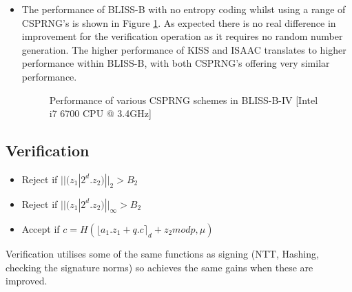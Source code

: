 \begin{itemize}
\item The performance of BLISS-B with no entropy coding whilst using a range of CSPRNG's is shown in Figure \ref{fig:bliss_b_csprng_comparison}. As expected there is no real difference in improvement for the verification operation as it requires no random number generation. The higher performance of KISS and ISAAC translates to higher performance within BLISS-B, with both CSPRNG's offering very similar performance.

\pgfplotsset{compat=1.13,width=15cm,height=10cm}
\begin{figure}[ht!]
\centering
{}
\caption{Performance of various CSPRNG schemes in BLISS-B-IV [Intel i7 6700 CPU @ 3.4GHz]}
\label{fig:bliss_b_csprng_comparison}
\end{figure}

\end{itemize}


\clearpage
\subsection{Verification}

\begin{itemize}
\item Reject if $||(z_1 | 2^d . z_2)||_2 > B_2$
\item Reject if $||(z_1 | 2^d . z_2)||_\infty > B_2$
\item Accept if $c = H(\lfloor a_1 . z_1 + q . c \rceil_d + z_2 mod p, \mu)$
\end{itemize}

Verification utilises some of the same functions as signing (NTT, Hashing, checking the signature norms) so achieves the same gains when these are improved.

